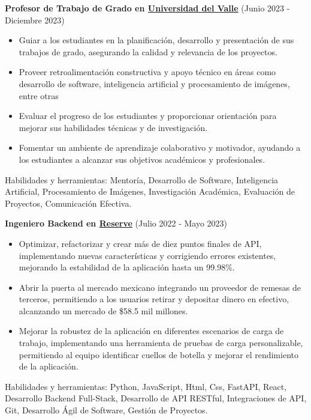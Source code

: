   \vspace*{0.2cm}
  \textbf{Profesor de Trabajo de Grado en \href{https://www.univalle.edu.co/}{Universidad del Valle}} (Junio 2023 - Diciembre 2023)
  \hfill
  \vspace*{0.2cm}
  \begin{minipage}{\linewidth}
    \begin{itemize}[noitemsep]
      \item Guiar a los estudiantes en la planificación, desarrollo y presentación de sus trabajos de grado, asegurando la calidad y relevancia de los proyectos.
      \item Proveer retroalimentación constructiva y apoyo técnico en áreas como desarrollo de software, inteligencia artificial y procesamiento de imágenes, entre otras
      \item Evaluar el progreso de los estudiantes y proporcionar orientación para mejorar sus habilidades técnicas y de investigación.
      \item Fomentar un ambiente de aprendizaje colaborativo y motivador, ayudando a los estudiantes a alcanzar sus objetivos académicos y profesionales.
    \end{itemize}
    \hfill
  \end{minipage}
  Habilidades y herramientas: Mentoría, Desarrollo de Software, Inteligencia Artificial, Procesamiento de Imágenes, Investigación Académica, Evaluación de Proyectos, Comunicación Efectiva.

  \vspace*{0.2cm}
  \textbf{Ingeniero Backend en \href{https://reserve.org/}{Reserve}} (Julio 2022 - Mayo 2023)
  \hfill
  \vspace*{0.2cm}
  \begin{minipage}{\linewidth}
    \begin{itemize}[noitemsep]
      \item Optimizar, refactorizar y crear más de diez puntos finales de API, implementando nuevas características y corrigiendo errores existentes, mejorando la estabilidad de la aplicación hasta un 99.98\%.
      \item Abrir la puerta al mercado mexicano integrando un proveedor de remesas de terceros, permitiendo a los usuarios retirar y depositar dinero en efectivo, alcanzando un mercado de \$58.5 mil millones.
      \item Mejorar la robustez de la aplicación en diferentes escenarios de carga de trabajo, implementando una herramienta de pruebas de carga personalizable, permitiendo al equipo identificar cuellos de botella y mejorar el rendimiento de la aplicación.
    \end{itemize}
    \hfill
  \end{minipage}
  Habilidades y herramientas: Python, JavaScript, Html, Css, FastAPI, React, Desarrollo Backend Full-Stack, Desarrollo de API RESTful, Integraciones de API, Git, Desarrollo Ágil de Software, Gestión de Proyectos.

